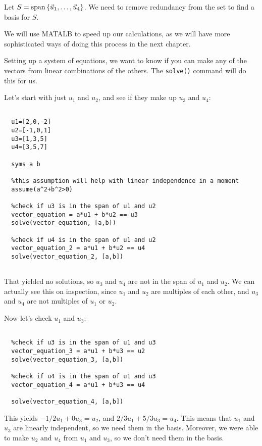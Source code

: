 \documentclass{ximera}
\begin{document}
\begin{solution}
  Let $S=\text{span}\left\{\vec{u}_1,\ldots,\vec{u}_4\right\}$. We need to remove redundancy from the set to find a basis for $S$.

  We will use MATALB to speed up our calculations, as we will have more sophisticated ways of doing this process in the next chapter.

  Setting up a system of equations, we want to know if you can make any of the vectors from linear combinations of the others. The \texttt{solve()} command will do this for us.

  Let's start with just $u_1$ and $u_2$, and see if they make up $u_3$ and $u_4$:

  \begin{verbatim}
  
  u1=[2,0,-2]
  u2=[-1,0,1]
  u3=[1,3,5]
  u4=[3,5,7]

  syms a b

  %this assumption will help with linear independence in a moment
  assume(a^2+b^2>0)

  %check if u3 is in the span of u1 and u2
  vector_equation = a*u1 + b*u2 == u3
  solve(vector_equation, [a,b])

  %check if u4 is in the span of u1 and u2
  vector_equation_2 = a*u1 + b*u2 == u4
  solve(vector_equation_2, [a,b])
  

  \end{verbatim}

  That yielded no solutions, so $u_3$ and $u_4$ are not in the span of $u_1$ and $u_2$. We can actually see this on inspection, since $u_1$ and $u_2$ are multiples of each other, and $u_3$ and $u_4$ are not multiples of $u_1$ or $u_2$.

  Now let's check $u_1$ and $u_3$:

  \begin{verbatim}

  %check if u3 is in the span of u1 and u3
  vector_equation_3 = a*u1 + b*u3 == u2
  solve(vector_equation_3, [a,b])

  %check if u4 is in the span of u1 and u3
  vector_equation_4 = a*u1 + b*u3 == u4

  solve(vector_equation_4, [a,b])

  \end{verbatim}

  This yields $-1/2 u_1 + 0 u_3 = u_2$, and $2/3 u_1 + 5/3 u_3 = u_4$. This means that $u_1$ and $u_3$ are linearly independent, so we need them in the basis. Moreover, we were able to make $u_2$ and $u_4$ from $u_1$ and $u_3$, so we don't need them in the basis.


\end{solution}
\end{document}
